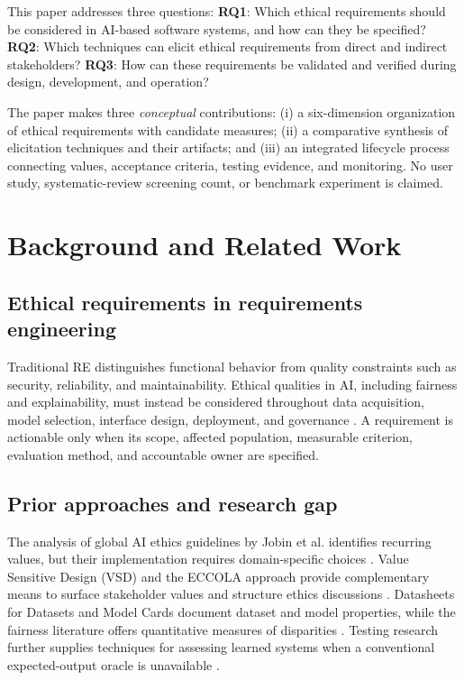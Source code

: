 \documentclass[11pt,a4paper]{article}
\begin{document}
This paper addresses three questions: \textbf{RQ1}: Which ethical requirements should be considered in AI-based software systems, and how can they be specified? \textbf{RQ2}: Which techniques can elicit ethical requirements from direct and indirect stakeholders? \textbf{RQ3}: How can these requirements be validated and verified during design, development, and operation?

The paper makes three \emph{conceptual} contributions: (i) a six-dimension organization of ethical requirements with candidate measures; (ii) a comparative synthesis of elicitation techniques and their artifacts; and (iii) an integrated lifecycle process connecting values, acceptance criteria, testing evidence, and monitoring. No user study, systematic-review screening count, or benchmark experiment is claimed.

\section{Background and Related Work}
\subsection{Ethical requirements in requirements engineering}
Traditional RE distinguishes functional behavior from quality constraints such as security, reliability, and maintainability. Ethical qualities in AI, including fairness and explainability, must instead be considered throughout data acquisition, model selection, interface design, deployment, and governance \cite{chung2000,horkoff2019,vogelsang2019}. A requirement is actionable only when its scope, affected population, measurable criterion, evaluation method, and accountable owner are specified.

\subsection{Prior approaches and research gap}
The analysis of global AI ethics guidelines by Jobin et al. identifies recurring values, but their implementation requires domain-specific choices \cite{jobin2019}. Value Sensitive Design (VSD) and the ECCOLA approach provide complementary means to surface stakeholder values and structure ethics discussions \cite{friedman2013,vakkuri2021}. Datasheets for Datasets and Model Cards document dataset and model properties, while the fairness literature offers quantitative measures of disparities \cite{gebru2021,mitchell2019,mehrabi2021}. Testing research further supplies techniques for assessing learned systems when a conventional expected-output oracle is unavailable \cite{chen2018,zhang2020}.
\end{document}
